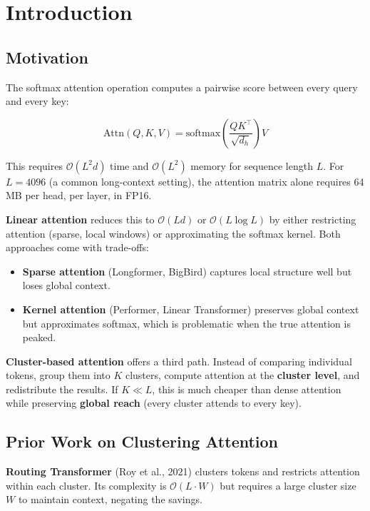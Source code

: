 \section{Introduction}

\subsection{Motivation}

The softmax attention operation computes a pairwise score between every 
query and every key:

\[
\text{Attn}(Q, K, V) = \text{softmax}\!\left(\frac{Q K^\top}{\sqrt{d_h}}\right) V
\]

This requires $\mathcal{O}(L^2 d)$ time and $\mathcal{O}(L^2)$ memory for 
sequence length $L$. For $L = 4096$ (a common long-context setting), the 
attention matrix alone requires 64 MB per head, per layer, in FP16.

\textbf{Linear attention} reduces this to $\mathcal{O}(L d)$ or 
$\mathcal{O}(L \log L)$ by either restricting attention (sparse, local 
windows) or approximating the softmax kernel. Both approaches come with 
trade-offs:

\begin{itemize}
\item \textbf{Sparse attention} (Longformer, BigBird) captures local structure well
  but loses global context.
\item \textbf{Kernel attention} (Performer, Linear Transformer) preserves global
  context but approximates softmax, which is problematic when the true
  attention is peaked.

\end{itemize}
\textbf{Cluster-based attention} offers a third path. Instead of comparing 
individual tokens, group them into $K$ clusters, compute attention at the 
\textbf{cluster level}, and redistribute the results. If $K \ll L$, this is much 
cheaper than dense attention while preserving \textbf{global reach} (every 
cluster attends to every key).

\subsection{Prior Work on Clustering Attention}

\textbf{Routing Transformer} (Roy et al., 2021) clusters tokens and restricts 
attention within each cluster. Its complexity is $\mathcal{O}(L \cdot W)$ 
but requires a large cluster size $W$ to maintain context, negating the 
savings.

